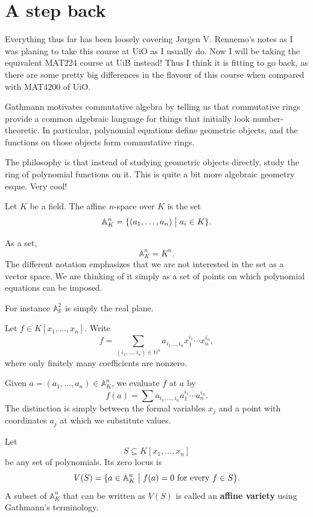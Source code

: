\documentclass[11pt]{article}
\begin{document}
\newpage 

\section{A step back}
Everything thus far has been loosely covering 
Jørgen V. Rennemo's notes as I was planing 
to take this course at UiO as I usually do. 
Now I will be taking the equivalent 
MAT224 course at UiB instead! 
Thus I think it is fitting to go back, as 
there are some pretty big differences 
in the flavour of this course when compared with 
MAT4200 of UiO. 

Gathmann motivates commutative algebra 
by telling us that commutative rings 
provide a common algebraic language for things 
that initially look number-theoretic. In particular, 
polynomial equations define geometric objects, and 
the functions on those objects form commutative rings. 

The philosophy is that instead of studying geometric 
objects directly, study the ring of polynomial functions 
on it. This is quite a bit more algebraic geometry esque. 
Very cool! 

\begin{defn}
    Let $K$ be a field. The affine $n$-space over $K$ is 
    the set 
    \[
        \mathbb A^n_K = \{(a_1,\ldots,a_n) \bigm| a_i \in K\}.
    \]
    
\end{defn}
As a set, 
\[
    \mathbb A_K^n = K^n.
\]
The different notation emphasizes that we are not interested 
in the set as a vector space. We are thinking 
of it simply as a set of points on which 
polynomial equations can be imposed. 

For instance $\mathbb A^2_{\mathbb R}$
is simply the real plane. 

Let $f\in K[x_1,\ldots,x_n]$. 
Write 
\[
    f = \sum_{(i_1,\ldots,i_n) \in \mathbb N^n} 
    a_{i_1\ldots,i_n}x_1^{i_1}\cdots x_n^{i_n},
\]
where only finitely many coefficients are nonzero. 

Given $a = (a_1,\ldots,a_n) \in \mathbb A^n_K$, 
we evaluate $f$ at $a$ by 
\[
    f(a) = \sum a_{i_1, \ldots, i_n} a_1^{i_1} \cdots a_n^{i_n}.
\] 
The distinction is simply between the formal 
variables $x_j$ and a point with coordinates $a_j$ at 
which we substitute values.

\begin{defn}
    Let 
    \[
        S \subseteq K[x_1,\ldots,x_n]
    \]
    be any set of polynomials. Its zero locus is 
    \[
        V(S) = \{a \in \mathbb A^n_K \bigm| f(a) = 0 \ 
        \text{for every} \ f \in S\}.
    \]
    A subset of $\mathbb A^n_K$ that can be 
    written as $V(S)$ is called an \textbf{affine variety} 
    using Gathmann's terminology. 
\end{defn}
\end{document}

